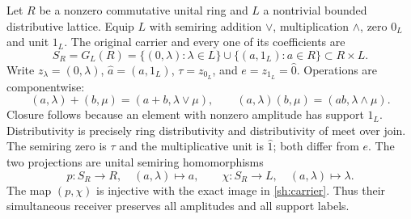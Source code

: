 \documentclass[11pt,a4paper]{article}
\theoremstyle{definition}\newtheorem{definition}[theorem]{Definition}
\begin{document}
Let $R$ be a nonzero commutative unital ring and $L$ a nontrivial
bounded distributive lattice.  Equip $L$ with semiring addition
$\vee$, multiplication $\wedge$, zero $0_L$ and unit $1_L$.
The original carrier and every one of its coefficients are
\begin{equation}\tag{SH1}\label{sh:carrier}
 S_R=G_L(R)=\{(0,\lambda):\lambda\in L\}
          \cup\{(a,1_L):a\in R\}\subset R\times L.
\end{equation}
Write $z_\lambda=(0,\lambda)$, $\widehat a=(a,1_L)$,
$\tau=z_{0_L}$, and $e=z_{1_L}=\widehat0$.
Operations are componentwise:
\begin{equation}\tag{SH2}\label{sh:operations}
 (a,\lambda)+(b,\mu)=(a+b,\lambda\vee\mu),\qquad
 (a,\lambda)(b,\mu)=(ab,\lambda\wedge\mu).
\end{equation}
Closure follows because an element with nonzero amplitude has
support $1_L$. Distributivity is precisely ring distributivity and
distributivity of meet over join. The semiring zero is $\tau$ and
the multiplicative unit is $\widehat1$; both differ from $e$.
The two projections are unital semiring homomorphisms
\begin{equation}\tag{SH3}\label{sh:projections}
 p:S_R\to R,\quad(a,\lambda)\mapsto a,\qquad
 \chi:S_R\to L,\quad(a,\lambda)\mapsto\lambda.
\end{equation}
The map $(p,\chi)$ is injective with the exact image in
\eqref{sh:carrier}. Thus their simultaneous receiver preserves all
amplitudes and all support labels.
\end{document}
